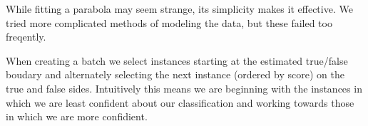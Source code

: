 \documentclass[ms,electronic,twosidetoc,letterpaper,chaptercenter,parttop,lof,lot]{byumsphd}
\begin{document}
While fitting a parabola may seem strange, its simplicity makes it effective. We tried more complicated methods of modeling the data, but these failed too freqently.

When creating a batch we select instances starting at the estimated true/false boudary and alternately selecting the next instance (ordered by score) on the true and false sides. Intuitively this means we are beginning with the instances in which we are least confident about our classification and working towards those in which we are more confidient.


\end{document}
